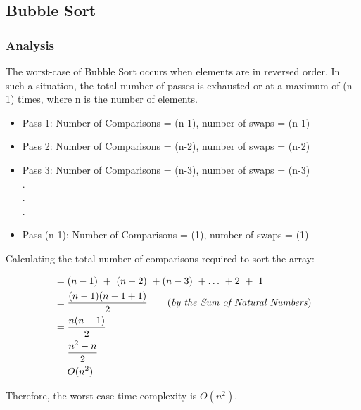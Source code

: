 \subsection{Bubble Sort}
\subsubsection{Analysis}

The worst-case of Bubble Sort occurs when elements are in reversed order. In such a situation, the total number of passes is exhausted or at a maximum of (n-1) times, where n is the number of elements.
\begin{itemize}
    \item Pass 1: Number of Comparisons = (n-1), number of swaps = (n-1)
    \item Pass 2: Number of Comparisons = (n-2), number of swaps = (n-2)    \item Pass 3: Number of Comparisons = (n-3), number of swaps = (n-3)\\
    .\\
    .\\
    .
\item Pass (n-1): Number of Comparisons = (1), number of swaps = (1)
\end{itemize}

Calculating the total number of comparisons required to sort the array:
\begin{center}
    \begin{align*}
        &= (n-1)\ +\ (n-2)\ + (n-3)\ +\dots\ + 2\ +\ 1\\
        &= \frac{(n-1)(n-1+1)}{2}\tag{\textit{by the Sum of Natural Numbers}}\\
        &= \frac{n(n-1)}{2}\\
        &= \frac{n^2 - n}{2}\\
        &= \textbf{\(O(n^2)\)}
    \end{align*}
\end{center}

Therefore, the worst-case time complexity is \(O(n^2)\).